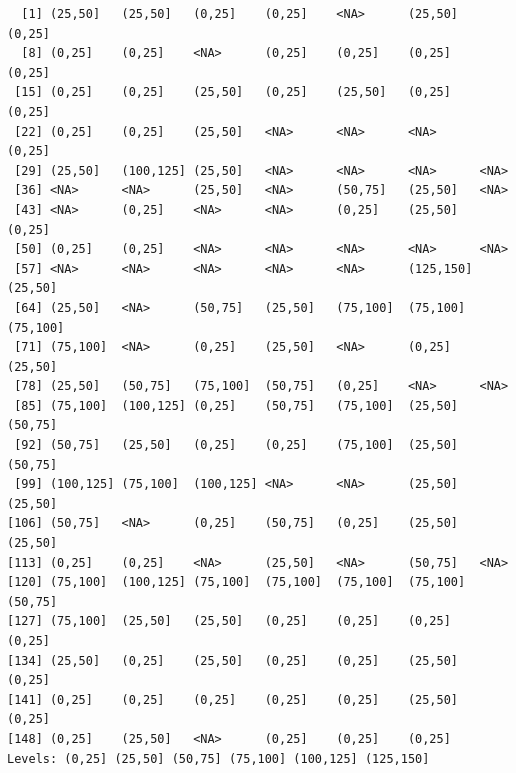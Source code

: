 \documentclass[
  letterpaper,
  DIV=11,
  numbers=noendperiod]{scrreprt}
\newenvironment{Shaded}{\begin{snugshade}}{\end{snugshade}}
\newcommand{\AttributeTok}[1]{\textcolor[rgb]{0.40,0.45,0.13}{#1}}
\newcommand{\DecValTok}[1]{\textcolor[rgb]{0.68,0.00,0.00}{#1}}
\newcommand{\FunctionTok}[1]{\textcolor[rgb]{0.28,0.35,0.67}{#1}}
\newcommand{\NormalTok}[1]{\textcolor[rgb]{0.00,0.23,0.31}{#1}}
\newcommand{\OtherTok}[1]{\textcolor[rgb]{0.00,0.23,0.31}{#1}}
\newcommand{\SpecialCharTok}[1]{\textcolor[rgb]{0.37,0.37,0.37}{#1}}
\begin{document}
\begin{Shaded}
\end{Shaded}

\begin{verbatim}
  [1] (25,50]   (25,50]   (0,25]    (0,25]    <NA>      (25,50]   (0,25]   
  [8] (0,25]    (0,25]    <NA>      (0,25]    (0,25]    (0,25]    (0,25]   
 [15] (0,25]    (0,25]    (25,50]   (0,25]    (25,50]   (0,25]    (0,25]   
 [22] (0,25]    (0,25]    (25,50]   <NA>      <NA>      <NA>      (0,25]   
 [29] (25,50]   (100,125] (25,50]   <NA>      <NA>      <NA>      <NA>     
 [36] <NA>      <NA>      (25,50]   <NA>      (50,75]   (25,50]   <NA>     
 [43] <NA>      (0,25]    <NA>      <NA>      (0,25]    (25,50]   (0,25]   
 [50] (0,25]    (0,25]    <NA>      <NA>      <NA>      <NA>      <NA>     
 [57] <NA>      <NA>      <NA>      <NA>      <NA>      (125,150] (25,50]  
 [64] (25,50]   <NA>      (50,75]   (25,50]   (75,100]  (75,100]  (75,100] 
 [71] (75,100]  <NA>      (0,25]    (25,50]   <NA>      (0,25]    (25,50]  
 [78] (25,50]   (50,75]   (75,100]  (50,75]   (0,25]    <NA>      <NA>     
 [85] (75,100]  (100,125] (0,25]    (50,75]   (75,100]  (25,50]   (50,75]  
 [92] (50,75]   (25,50]   (0,25]    (0,25]    (75,100]  (25,50]   (50,75]  
 [99] (100,125] (75,100]  (100,125] <NA>      <NA>      (25,50]   (25,50]  
[106] (50,75]   <NA>      (0,25]    (50,75]   (0,25]    (25,50]   (25,50]  
[113] (0,25]    (0,25]    <NA>      (25,50]   <NA>      (50,75]   <NA>     
[120] (75,100]  (100,125] (75,100]  (75,100]  (75,100]  (75,100]  (50,75]  
[127] (75,100]  (25,50]   (25,50]   (0,25]    (0,25]    (0,25]    (0,25]   
[134] (25,50]   (0,25]    (25,50]   (0,25]    (0,25]    (25,50]   (0,25]   
[141] (0,25]    (0,25]    (0,25]    (0,25]    (0,25]    (25,50]   (0,25]   
[148] (0,25]    (25,50]   <NA>      (0,25]    (0,25]    (0,25]   
Levels: (0,25] (25,50] (50,75] (75,100] (100,125] (125,150]
\end{verbatim}

\begin{Shaded}
\end{Shaded}
\end{document}
